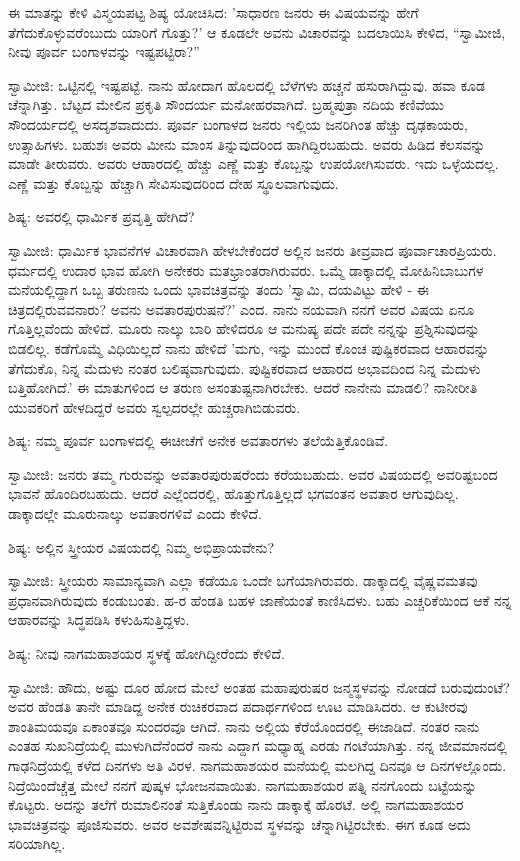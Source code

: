 ಈ ಮಾತನ್ನು ಕೇಳಿ ವಿಸ್ಮಯಪಟ್ಟ ಶಿಷ್ಯ ಯೋಚಿಸಿದ: 'ಸಾಧಾರಣ ಜನರು ಈ ವಿಷಯವನ್ನು ಹೇಗೆ ತೆಗೆದುಕೊಳ್ಳುವರೆಂಬುದು ಯಾರಿಗೆ ಗೊತ್ತು?' ಆ ಕೂಡಲೇ ಅವನು ವಿಚಾರವನ್ನು ಬದಲಾಯಿಸಿ ಕೇಳಿದ, “ಸ್ವಾಮೀಜಿ, ನೀವು ಪೂರ್ವ ಬಂಗಾಳವನ್ನು ಇಷ್ಟಪಟ್ಟಿರಾ?”

ಸ್ವಾಮೀಜಿ: ಒಟ್ಟಿನಲ್ಲಿ ಇಷ್ಟಪಟ್ಟೆ. ನಾನು ಹೋದಾಗ ಹೊಲದಲ್ಲಿ ಬೆಳೆಗಳು ಹಚ್ಚನೆ ಹಸುರಾಗಿದ್ದುವು. ಹವಾ ಕೂಡ ಚೆನ್ನಾಗಿತ್ತು. ಬೆಟ್ಟದ ಮೇಲಿನ ಪ್ರಕೃತಿ ಸೌಂದರ್ಯ ಮನೋಹರವಾಗಿದೆ. ಬ್ರಹ್ಮಪುತ್ರಾ ನದಿಯ ಕಣಿವೆಯು ಸೌಂದರ್ಯದಲ್ಲಿ ಅಸದೃಶವಾದುದು. ಪೂರ್ವ ಬಂಗಾಳದ ಜನರು ಇಲ್ಲಿಯ ಜನರಿಗಿಂತ ಹೆಚ್ಚು ದೃಢಕಾಯರು, ಉತ್ಸಾಹಿಗಳು. ಬಹುಶಃ ಅವರು ಮೀನು ಮಾಂಸ ತಿನ್ನುವುದರಿಂದ ಹಾಗಿದ್ದಿರಬಹುದು. ಅವರು ಹಿಡಿದ ಕೆಲಸವನ್ನು ಮಾಡೇ ತೀರುವರು. ಅವರು ಆಹಾರದಲ್ಲಿ ಹೆಚ್ಚು ಎಣ್ಣೆ ಮತ್ತು ಕೊಬ್ಬನ್ನು ಉಪಯೋಗಿಸುವರು. ಇದು ಒಳ್ಳೆಯದಲ್ಲ. ಎಣ್ಣೆ ಮತ್ತು ಕೊಬ್ಬನ್ನು ಹೆಚ್ಚಾಗಿ ಸೇವಿಸುವುದರಿಂದ ದೇಹ ಸ್ಥೂಲವಾಗುವುದು.

ಶಿಷ್ಯ: ಅವರಲ್ಲಿ ಧಾರ್ಮಿಕ ಪ್ರವೃತ್ತಿ ಹೇಗಿದೆ?

ಸ್ವಾಮೀಜಿ: ಧಾರ್ಮಿಕ ಭಾವನೆಗಳ ವಿಚಾರವಾಗಿ ಹೇಳಬೇಕೆಂದರೆ ಅಲ್ಲಿನ ಜನರು ತೀವ್ರವಾದ ಪೂರ್ವಾಚಾರಪ್ರಿಯರು. ಧರ್ಮದಲ್ಲಿ ಉದಾರ ಭಾವ ಹೋಗಿ ಅನೇಕರು ಮತಭ್ರಾಂತರಾಗಿರುವರು. ಒಮ್ಮೆ ಡಾಕ್ಕಾದಲ್ಲಿ ಮೋಹಿನಿಬಾಬುಗಳ ಮನೆಯಲ್ಲಿದ್ದಾಗ ಒಬ್ಬ ತರುಣನು ಒಂದು ಭಾವಚಿತ್ರವನ್ನು ತಂದು 'ಸ್ವಾಮಿ, ದಯವಿಟ್ಟು ಹೇಳಿ - ಈ ಚಿತ್ರದಲ್ಲಿರುವವನಾರು? ಅವನು ಅವತಾರಪುರುಷನೆ?' ಎಂದ. ನಾನು ನಯವಾಗಿ ನನಗೆ ಅವರ ವಿಷಯ ಏನೂ ಗೊತ್ತಿಲ್ಲವೆಂದು ಹೇಳಿದೆ. ಮೂರು ನಾಲ್ಕು ಬಾರಿ ಹೇಳಿದರೂ ಆ ಮನುಷ್ಯ ಪದೇ ಪದೇ ನನ್ನನ್ನು ಪ್ರಶ್ನಿಸುವುದನ್ನು ಬಿಡಲಿಲ್ಲ. ಕಡೆಗೊಮ್ಮೆ ವಿಧಿಯಿಲ್ಲದೆ ನಾನು ಹೇಳಿದೆ 'ಮಗು, ಇನ್ನು ಮುಂದೆ ಕೊಂಚ ಪುಷ್ಟಿಕರವಾದ ಆಹಾರವನ್ನು ತೆಗೆದುಕೊ, ನಿನ್ನ ಮೆದುಳು ನಂತರ ಬಲಿಷ್ಠವಾಗುವುದು. ಪುಷ್ಟಿಕರವಾದ ಆಹಾರದ ಅಭಾವದಿಂದ ನಿನ್ನ ಮೆದುಳು ಬತ್ತಿಹೋಗಿದೆ.' ಈ ಮಾತುಗಳಿಂದ ಆ ತರುಣ ಅಸಂತುಷ್ಟನಾಗಿರಬೇಕು. ಆದರೆ ನಾನೇನು ಮಾಡಲಿ? ನಾನೀರೀತಿ ಯುವಕರಿಗೆ ಹೇಳದಿದ್ದರೆ ಅವರು ಸ್ವಲ್ಪದರಲ್ಲೇ ಹುಚ್ಚರಾಗಿಬಿಡುವರು.

ಶಿಷ್ಯ: ನಮ್ಮ ಪೂರ್ವ ಬಂಗಾಳದಲ್ಲಿ ಈಚೀಚೆಗೆ ಅನೇಕ ಅವತಾರಗಳು ತಲೆಯೆತ್ತಿಕೊಂಡಿವೆ.

ಸ್ವಾಮೀಜಿ: ಜನರು ತಮ್ಮ ಗುರುವನ್ನು ಅವತಾರಪುರುಷರೆಂದು ಕರೆಯಬಹುದು. ಅವರ ವಿಷಯದಲ್ಲಿ ಅವರಿಷ್ಟಬಂದ ಭಾವನೆ ಹೊಂದಿರಬಹುದು. ಆದರೆ ಎಲ್ಲೆಂದರಲ್ಲಿ, ಹೊತ್ತುಗೊತ್ತಿಲ್ಲದೆ ಭಗವಂತನ ಅವತಾರ ಆಗುವುದಿಲ್ಲ. ಡಾಕ್ಕಾದಲ್ಲೇ ಮೂರುನಾಲ್ಕು ಅವತಾರಗಳಿವೆ ಎಂದು ಕೇಳಿದೆ.

ಶಿಷ್ಯ: ಅಲ್ಲಿನ ಸ್ತ್ರೀಯರ ವಿಷಯದಲ್ಲಿ ನಿಮ್ಮ ಅಭಿಪ್ರಾಯವೇನು?

ಸ್ವಾಮೀಜಿ: ಸ್ತ್ರೀಯರು ಸಾಮಾನ್ಯವಾಗಿ ಎಲ್ಲಾ ಕಡೆಯೂ ಒಂದೇ ಬಗೆಯಾಗಿರುವರು. ಡಾಕ್ಕಾದಲ್ಲಿ ವೈಷ್ಣವಮತವು ಪ್ರಧಾನವಾಗಿರುವುದು ಕಂಡುಬಂತು. ಹ-ರ ಹೆಂಡತಿ ಬಹಳ ಜಾಣೆಯಂತೆ ಕಾಣಿಸಿದಳು. ಬಹು ಎಚ್ಚರಿಕೆಯಿಂದ ಆಕೆ ನನ್ನ ಆಹಾರವನ್ನು ಸಿದ್ಧಪಡಿಸಿ ಕಳುಹಿಸುತ್ತಿದ್ದಳು.

ಶಿಷ್ಯ: ನೀವು ನಾಗಮಹಾಶಯರ ಸ್ಥಳಕ್ಕೆ ಹೋಗಿದ್ದೀರೆಂದು ಕೇಳಿದೆ.

ಸ್ವಾಮೀಜಿ: ಹೌದು, ಅಷ್ಟು ದೂರ ಹೋದ ಮೇಲೆ ಅಂತಹ ಮಹಾಪುರುಷರ ಜನ್ಮಸ್ಥಳವನ್ನು ನೋಡದೆ ಬರುವುದುಂಟೆ? ಅವರ ಹೆಂಡತಿ ತಾನೇ ಮಾಡಿದ್ದ ಅನೇಕ ರುಚಿಕರವಾದ ಪದಾರ್ಥಗಳಿಂದ ಊಟ ಮಾಡಿಸಿದರು. ಆ ಕುಟೀರವು ಶಾಂತಿಮಯವೂ ಏಕಾಂತವೂ ಸುಂದರವೂ ಆಗಿದೆ. ನಾನು ಅಲ್ಲಿಯ ಕೆರೆಯೊಂದರಲ್ಲಿ ಈಜಾಡಿದೆ. ನಂತರ ನಾನು ಎಂತಹ ಸುಖನಿದ್ರೆಯಲ್ಲಿ ಮುಳುಗಿದೆನೆಂದರೆ ನಾನು ಎದ್ದಾಗ ಮಧ್ಯಾಹ್ನ ಎರಡು ಗಂಟೆಯಾಗಿತ್ತು. ನನ್ನ ಜೀವಮಾನದಲ್ಲಿ ಗಾಢನಿದ್ರೆಯಲ್ಲಿ ಕಳೆದ ದಿನಗಳು ಅತಿ ವಿರಳ. ನಾಗಮಹಾಶಯರ ಮನೆಯಲ್ಲಿ ಮಲಗಿದ್ದ ದಿನವೂ ಆ ದಿನಗಳಲ್ಲೊಂದು. ನಿದ್ರೆಯಿಂದೆಚ್ಚೆತ್ತ ಮೇಲೆ ನನಗೆ ಪುಷ್ಕಳ ಭೋಜನವಾಯಿತು. ನಾಗಮಹಾಶಯರ ಪತ್ನಿ ನನಗೊಂದು ಬಟ್ಟೆಯನ್ನು ಕೊಟ್ಟರು. ಅದನ್ನು ತಲೆಗೆ ರುಮಾಲಿನಂತೆ ಸುತ್ತಿಕೊಂಡು ನಾನು ಡಾಕ್ಕಾಕ್ಕೆ ಹೊರಟೆ. ಅಲ್ಲಿ ನಾಗಮಹಾಶಯರ ಭಾವಚಿತ್ರವನ್ನು ಪೂಜಿಸುವರು. ಅವರ ಅವಶೇಷವನ್ನಿಟ್ಟಿರುವ ಸ್ಥಳವನ್ನು ಚೆನ್ನಾಗಿಟ್ಟಿರಬೇಕು. ಈಗ ಕೂಡ ಅದು ಸರಿಯಾಗಿಲ್ಲ.

